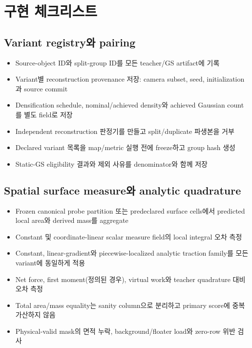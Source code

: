 \documentclass[10pt,a4paper]{article}
\begin{document}
\section{구현 체크리스트}
\label{sec:r3-chapter-4}

\subsection{Variant registry와 pairing}

\begin{itemize}
  \item[$\square$] Source-object ID와 split-group ID를 모든 teacher/GS artifact에 기록
  \item[$\square$] Variant별 reconstruction provenance 저장: camera subset, seed, initialization과 source commit
  \item[$\square$] Densification schedule, nominal/achieved density와 achieved Gaussian count를 별도 field로 저장
  \item[$\square$] Independent reconstruction 판정기를 만들고 split/duplicate 파생본을 거부
  \item[$\square$] Declared variant 목록을 map/metric 실행 전에 freeze하고 group hash 생성
  \item[$\square$] Static-GS eligibility 결과와 제외 사유를 denominator와 함께 저장
\end{itemize}

\subsection{Spatial surface measure와 analytic quadrature}

\begin{itemize}
  \item[$\square$] Frozen canonical probe partition 또는 predeclared surface cells에서
  predicted local area와 derived mass를 aggregate
  \item[$\square$] Constant 및 coordinate-linear scalar measure field의 local integral 오차 측정
  \item[$\square$] Constant, linear-gradient와 piecewise-localized analytic traction family를
  모든 variant에 동일하게 적용
  \item[$\square$] Net force, first moment(정의된 경우), virtual work와 teacher quadrature 대비 오차 측정
  \item[$\square$] Total area/mass equality는 sanity column으로 분리하고 primary score에 중복 가산하지 않음
  \item[$\square$] Physical-valid mask의 면적 누락, background/floater load와 zero-row 위반 검사
\end{itemize}
\end{document}

